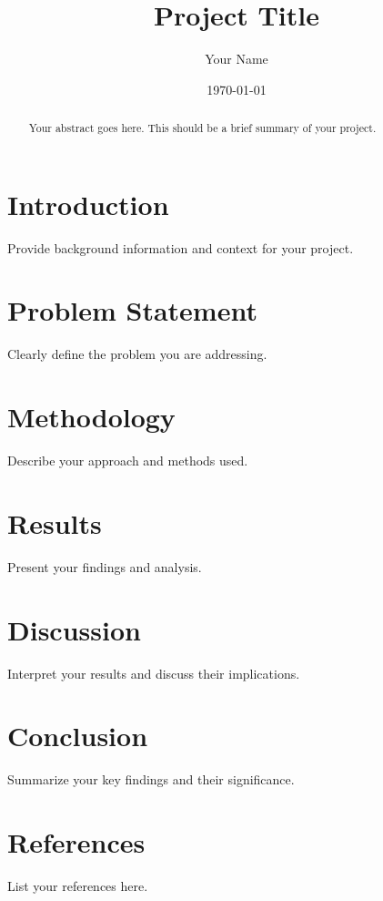 \documentclass[12pt]{article}
\title{Project Title}
\author{Your Name}
\date{\today}
\begin{document}
\maketitle

\begin{abstract}
Your abstract goes here. This should be a brief summary of your project.
\end{abstract}

\section{Introduction}
Provide background information and context for your project.

\section{Problem Statement}
Clearly define the problem you are addressing.

\section{Methodology}
Describe your approach and methods used.

\section{Results}
Present your findings and analysis.

\section{Discussion}
Interpret your results and discuss their implications.

\section{Conclusion}
Summarize your key findings and their significance.

\section{References}
List your references here.
\end{document}
